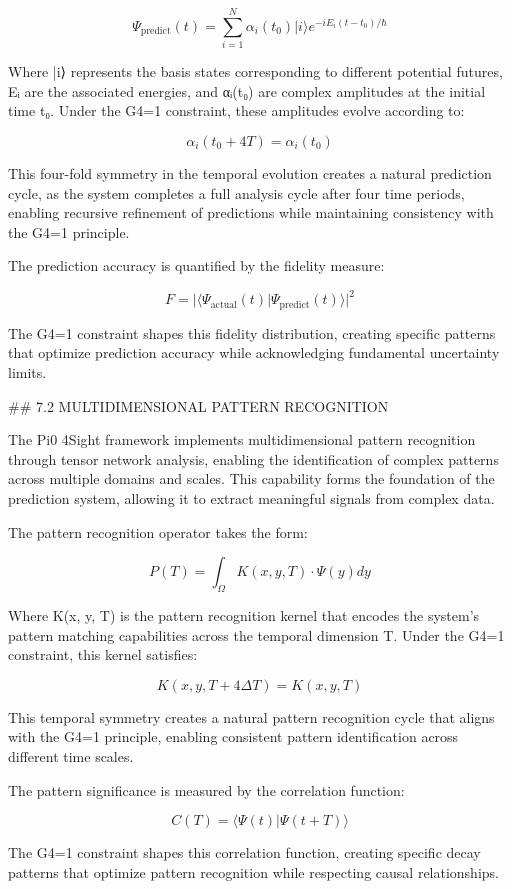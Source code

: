 $$\Psi_{\text{predict}}(t) = \sum_{i=1}^{N} \alpha_i(t_0) |i\rangle e^{-iE_i(t-t_0)/\hbar}$$

Where |i⟩ represents the basis states corresponding to different potential futures, Eᵢ are the associated energies, and αᵢ(t₀) are complex amplitudes at the initial time t₀. Under the G4=1 constraint, these amplitudes evolve according to:

$$\alpha_i(t_0 + 4T) = \alpha_i(t_0)$$

This four-fold symmetry in the temporal evolution creates a natural prediction cycle, as the system completes a full analysis cycle after four time periods, enabling recursive refinement of predictions while maintaining consistency with the G4=1 principle.

The prediction accuracy is quantified by the fidelity measure:

$$F = |\langle \Psi_{\text{actual}}(t) | \Psi_{\text{predict}}(t) \rangle|^2$$

The G4=1 constraint shapes this fidelity distribution, creating specific patterns that optimize prediction accuracy while acknowledging fundamental uncertainty limits.

## 7.2 MULTIDIMENSIONAL PATTERN RECOGNITION

The Pi0 4Sight framework implements multidimensional pattern recognition through tensor network analysis, enabling the identification of complex patterns across multiple domains and scales. This capability forms the foundation of the prediction system, allowing it to extract meaningful signals from complex data.

The pattern recognition operator takes the form:

$$P(T) = \int_{\Omega} K(x, y, T) \cdot \Psi(y) dy$$

Where K(x, y, T) is the pattern recognition kernel that encodes the system's pattern matching capabilities across the temporal dimension T. Under the G4=1 constraint, this kernel satisfies:

$$K(x, y, T+4\Delta T) = K(x, y, T)$$

This temporal symmetry creates a natural pattern recognition cycle that aligns with the G4=1 principle, enabling consistent pattern identification across different time scales.

The pattern significance is measured by the correlation function:

$$C(T) = \langle \Psi(t) | \Psi(t+T) \rangle$$

The G4=1 constraint shapes this correlation function, creating specific decay patterns that optimize pattern recognition while respecting causal relationships.

